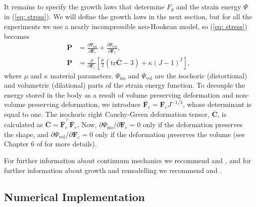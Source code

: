It remains to specify the growth laws that determine $F_g$ and the strain energy $\Psi$ in 
(\ref{eq: stress}). We will define the growth laws in the next section, but for all the 
experiments we use a nearly incompressible neo-Hookean model, so (\ref{eq: stress}) becomes
\begin{align*}
    \mathbf{P} &= \frac{\partial\Psi_\text{iso}}{\partial \mathbf{F}_e} + \frac{\partial\Psi_\text{vol}}{\partial \mathbf{F}_e}, \\
    \mathbf{P} &= \frac{\partial}{\partial \mathbf{F}_e}\left[\frac{\mu}{2}\left(\mathrm{tr}\mathbf{\bar{C}} - 3\right) + \kappa(J-1)^2\right],
\end{align*}
where $\mu$ and $\kappa$ material parameters. $\Psi_\text{iso}$ and $\Psi_\text{vol}$ are the isochoric (distortional) and volumetric (dilational) parts of the strain energy function. To decouple the energy stored in the body as a result of volume preserving deformation and non-volume preserving deformation, we introduce $\mathbf{\bar{F}}_e = \mathbf{F}_eJ^{-1/3}$, whose determinant is equal to one. The isochoric right Cauchy-Green deformation tensor, $\mathbf{\bar{C}}$, is calculated as $\mathbf{\bar{C}} = \mathbf{\bar{F}}_e^\top \mathbf{\bar{F}}_e$. Now, $\partial\Psi_\text{iso}/\partial \mathbf{F}_e = 0$ only if the deformation preserves the shape, and $\partial\Psi_\text{vol}/\partial \mathbf{F}_e = 0$ only if the deformation preserves the volume (see Chapter 6 of \citep{Holzapfel2002} for more details). \par 
For further information about continuum mechanics we recommend \citep{Marsden1983} and \citep{Holzapfel2002}, and for further information about growth and remodelling we recommend \citep{Goriely2017} and \citep{Yavari2010}.

\subsection{Numerical Implementation}
 
